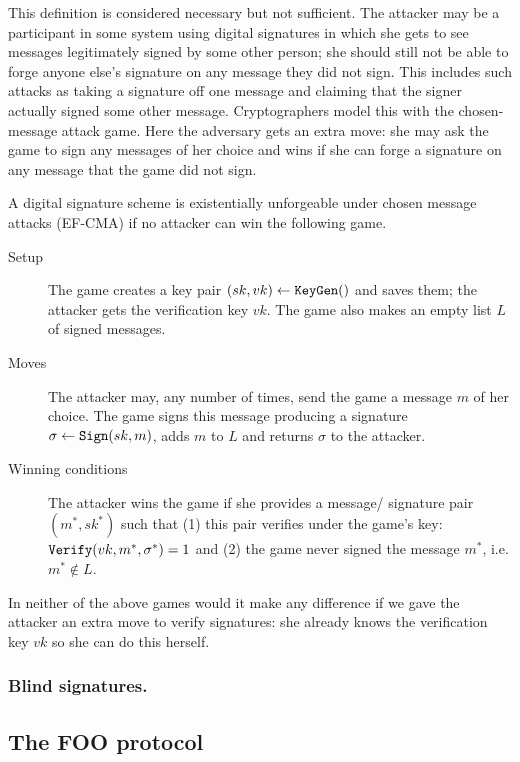 \documentclass{llncs}
\newcommand{\alg}[1]{\textup{\texttt{#1}}}
\begin{document}
This definition is considered necessary but not sufficient. The attacker may be
a participant in some system using digital signatures in which she gets to see
messages legitimately signed by some other person; she should still not be able
to forge anyone else's signature on any message they did not sign. This includes
such attacks as taking a signature off one message and claiming that the signer
actually signed some other message. Cryptographers model this with the chosen-
message attack game. Here the adversary gets an extra move: she may ask the game
to sign any messages of her choice and wins if she can forge a signature on any
message that the game did not sign.

\begin{definition}
A digital signature scheme is existentially unforgeable under chosen message
attacks (EF-CMA) if no attacker can win the following game.

\begin{description}
\item[Setup] The game creates a key pair $(sk, vk) \gets \alg{KeyGen}()$ and
saves them; the attacker gets the verification key $vk$. The game also makes an
empty list $L$ of signed messages.

\item[Moves] The attacker may, any number of times, send the game a message $m$
of her choice. The game signs this message producing a signature $\sigma \gets
\alg{Sign}(sk, m)$, adds $m$ to $L$ and returns $\sigma$ to the attacker.

\item[Winning conditions] The attacker wins the game if she provides a message/
signature pair $(m^*, sk^*)$ such that (1) this pair verifies under the game's
key: $\alg{Verify}(vk, m^*, \sigma^*) = 1$ and (2) the game never signed the
message $m^*$, i.e. $m^* \notin L$.
\end{description}
\end{definition}

In neither of the above games would it make any difference if we gave the
attacker an extra move to verify signatures: she already knows the verification
key $vk$ so she can do this herself.

\subsubsection{Blind signatures.}

\subsection{The FOO protocol}
\end{document}
